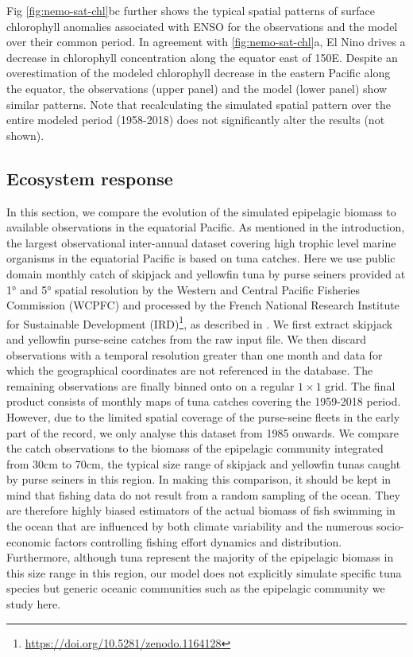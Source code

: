 Fig \ref{fig:nemo-sat-chl}bc further shows the typical spatial patterns of surface chlorophyll anomalies associated with ENSO for the observations and the model over their common period. In agreement with \ref{fig:nemo-sat-chl}a, El Nino drives a decrease in chlorophyll concentration along the equator east of 150\degree{}E. Despite an overestimation of the modeled chlorophyll decrease in the eastern Pacific along the equator, the observations (upper panel) and the model (lower panel) show similar patterns. Note that recalculating the simulated spatial pattern over the entire modeled period (1958-2018) does not significantly alter the results (not shown). 

\subsection{Ecosystem response}

In this section, we compare the evolution of the simulated epipelagic biomass to available observations in the equatorial Pacific. As mentioned in the introduction, the largest observational inter-annual dataset covering high trophic level marine organisms in the equatorial Pacific is based on tuna catches. Here we use public domain monthly catch of skipjack and yellowfin tuna by purse seiners provided at 1° and 5° spatial resolution by the Western and Central Pacific Fisheries Commission (WCPFC) and processed by the French National Research Institute for Sustainable Development (IRD)\footnote{\url{https://doi.org/10.5281/zenodo.1164128}}, as described in  \citep{taconetGlobalMonthlyCatch2018}. We first extract skipjack and yellowfin purse-seine catches from the raw input file. We then discard observations with a temporal resolution greater than one month and data for which the geographical coordinates are not referenced in the database. The remaining observations are finally binned onto on a regular $1 \times 1$ grid. The final product consists of monthly maps of tuna catches covering the 1959-2018 period. However, due to the limited spatial coverage of the purse-seine fleets in the early part of the record, we only analyse this dataset from 1985 onwards. We compare the catch observations to the biomass of the epipelagic community integrated from 30cm to 70cm, the typical size range of  skipjack and yellowfin tunas caught by purse seiners in this region. In making this comparison, it should be kept in mind that fishing data do not result from a random sampling of the ocean. They are therefore highly biased estimators of the actual biomass of fish swimming in the ocean that are influenced by both climate variability and the numerous socio-economic factors controlling fishing effort dynamics and distribution. Furthermore, although tuna represent the majority of the epipelagic biomass in this size range in this region, our model does not explicitly simulate specific tuna species but generic oceanic communities such as the epipelagic community we study here.

